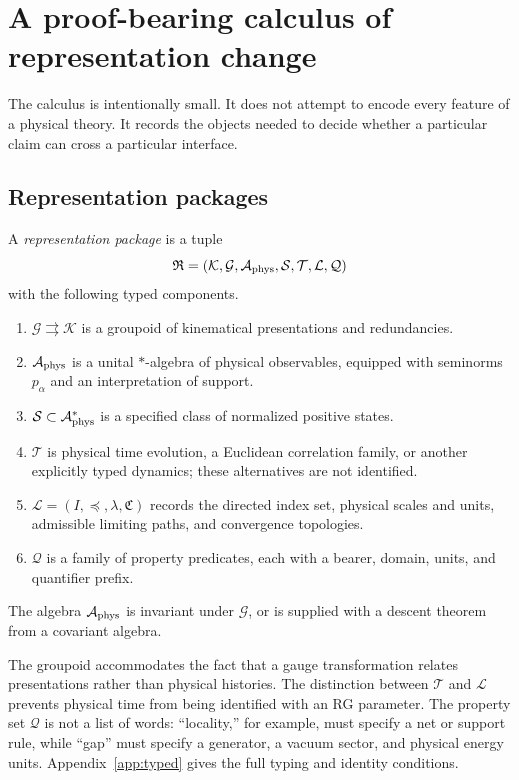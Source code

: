 \section{A proof-bearing calculus of representation change}
\label{sec:calculus}

The calculus is intentionally small.  It does not attempt to encode every
feature of a physical theory.  It records the objects needed to decide whether
a particular claim can cross a particular interface.

\subsection{Representation packages}

\begin{definition}
\label{def:package}
A \emph{representation package} is a tuple
\[
 \mathfrak R=(\mathcal K,\mathcal G,\mathcal A_{\mathrm{phys}},\mathcal S,\mathcal T,
       \mathcal L,\mathcal Q)
\]
with the following typed components.
\begin{enumerate}[label=(\roman*),itemsep=2pt]
 \item $\mathcal G\rightrightarrows\mathcal K$ is a groupoid of
 kinematical presentations and redundancies.
 \item $\mathcal A_{\mathrm{phys}}$ is a unital $*$-algebra of physical observables, equipped
 with seminorms $p_\alpha$ and an interpretation of support.
 \item $\mathcal S\subset\mathcal A_{\mathrm{phys}}^{*}$ is a specified class of normalized
 positive states.
 \item $\mathcal T$ is physical time evolution, a Euclidean correlation
 family, or another explicitly typed dynamics; these alternatives are not
 identified.
 \item $\mathcal L=(I,\preceq,\lambda,\mathfrak C)$ records the directed
 index set, physical scales and units, admissible limiting paths, and
 convergence topologies.
 \item $\mathcal Q$ is a family of property predicates, each with a bearer,
 domain, units, and quantifier prefix.
\end{enumerate}
The algebra $\mathcal A_{\mathrm{phys}}$ is invariant under $\mathcal G$, or is supplied with a
descent theorem from a covariant algebra.
\end{definition}

The groupoid accommodates the fact that a gauge transformation relates
presentations rather than physical histories.  The distinction between
$\mathcal T$ and $\mathcal L$ prevents physical time from being identified
with an RG parameter.  The property set $\mathcal Q$ is not a list of words:
``locality,'' for example, must specify a net or support rule, while ``gap''
must specify a generator, a vacuum sector, and physical energy units.
Appendix~\ref{app:typed} gives the full typing and identity conditions.

